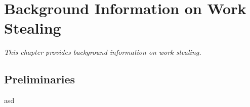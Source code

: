 \chapter{Background Information on Work Stealing}

\textit{This chapter provides background information on work stealing.}

\section{Preliminaries}
asd